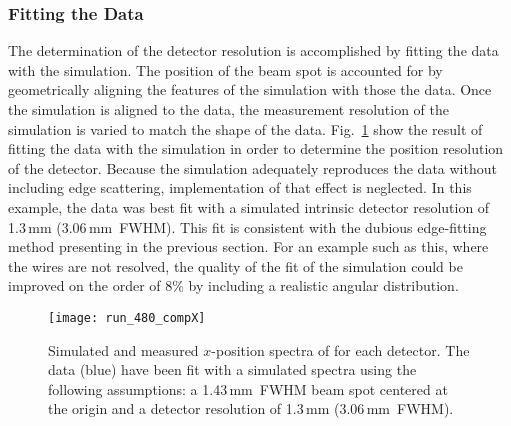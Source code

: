 \subsubsection{Fitting the Data}
The determination of the detector resolution is accomplished by fitting the data with the simulation. The position of the beam spot is accounted for by geometrically aligning the features of the simulation with those the data. Once the simulation is aligned to the data, the measurement resolution of the simulation is varied to match the shape of the data. Fig.~\ref{sim_comp} show the result of fitting the data with the simulation in order to determine the position resolution of the detector. Because the simulation adequately reproduces the data without including edge scattering, implementation of that effect is neglected. In this example, the data was best fit with a simulated intrinsic detector resolution of 1.3\,mm (3.06\,mm~FWHM).  This fit is consistent with the dubious edge-fitting method presenting in the previous section. For an example such as this, where the wires are not resolved, the quality of the fit of the simulation could be improved on the order of 8\% by including a realistic angular distribution.
\begin{figure}%
\texttt{[image: run\_480\_compX]}%
\caption{Simulated and measured $x$-position spectra of for each detector. The data (blue) have been fit with a simulated spectra using the following assumptions: a 1.43\,mm~FWHM beam spot centered at the origin and a detector resolution of 1.3\,mm (3.06\,mm~FWHM).}%
\label{sim_comp}%
\end{figure}


